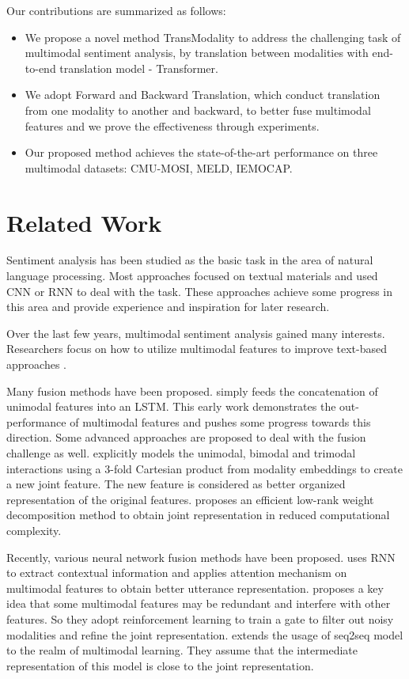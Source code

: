 \documentclass[sigconf]{acmart}
\begin{document}
	Our contributions are summarized as follows:
	\begin{itemize}
		\item We propose a novel method TransModality to address the challenging task of multimodal sentiment analysis, by translation between modalities with end-to-end translation model - Transformer.
		\item We adopt Forward and Backward Translation, which conduct translation from one modality to another and backward, to better fuse multimodal features and we prove the effectiveness through experiments.
		\item Our proposed method achieves the state-of-the-art performance on three multimodal datasets: CMU-MOSI, MELD, IEMOCAP.
	\end{itemize}
	
	\section{Related Work}
	Sentiment analysis has been studied as the basic task in the area of natural language processing. Most approaches focused on textual materials and used CNN \cite{kim2014convolutional,krizhevsky2012imagenet} or RNN \cite{hochreiter1997long,chung2014empirical,liu2016recurrent,abdul2017emonet} to deal with the task. These approaches achieve some progress in this area and provide experience and inspiration for later research.

	Over the last few years, multimodal sentiment analysis gained many interests. Researchers focus on how to utilize multimodal features to improve text-based approaches \cite{lian2018investigation}.
	
	Many fusion methods have been proposed. \citet{poria2017context} simply feeds the concatenation of unimodal features into an LSTM. This early work demonstrates the out-performance of multimodal features and pushes some progress towards this direction. Some advanced approaches are proposed to deal with the fusion challenge as well. \citet{zadeh2017tensor} explicitly models the unimodal, bimodal and trimodal interactions using a 3-fold Cartesian product from modality embeddings to create a new joint feature. The new feature is considered as better organized representation of the original features. \citet{liu2018efficient} proposes an efficient low-rank weight decomposition method to obtain joint representation in reduced computational complexity.
	
	Recently, various neural network fusion methods have been proposed. \citet{ghosal2018contextual} uses RNN to extract contextual information and applies attention mechanism on multimodal features to obtain better utterance representation. \citet{chen2017multimodal} proposes a key idea that some multimodal features may be redundant and interfere with other features. So they adopt reinforcement learning to train a gate to filter out noisy modalities and refine the joint representation. \citet{pham2018seq2seq2sentiment,pham2018found} extends the usage of seq2seq model to the realm of multimodal learning. They assume that the intermediate representation of this model is close to the joint representation.
	
\end{document}

